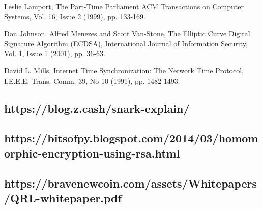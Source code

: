 \documentclass[11pt]{article}
\begin{document}
Leslie Lamport, The Part-Time Parliament ACM Transactions on Computer Systems, Vol. 16, Issue 2 (1999), pp. 133-169.


Don Johnson, Alfred Menezes and Scott Van-Stone, The Elliptic Curve Digital Signature Algorithm (ECDSA), International Journal of Information Security, Vol. 1, Issue 1 (2001), pp. 36-63.


David L. Mills, Internet Time Synchronization: The Network Time Protocol, I.E.E.E. Trans. Comm. 39, No 10 (1991), pp. 1482-1493.


\subsection{https://blog.z.cash/snark-explain/}

\subsection{https://bitsofpy.blogspot.com/2014/03/homomorphic-encryption-using-rsa.html}

\subsection{https://bravenewcoin.com/assets/Whitepapers/QRL-whitepaper.pdf}
\end{document}
